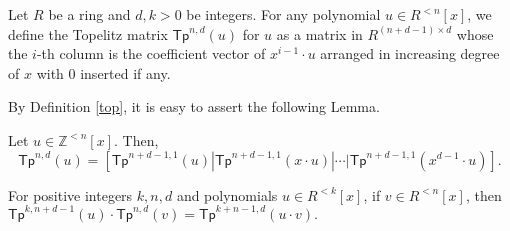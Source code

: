 \documentclass[runningheads]{llncs}
\begin{document}
\begin{definition} \label{top}
	Let $R$ be a ring and $d,k >0$ be integers.
	For any polynomial $u\in R^{<n}[x]$, we define the Topelitz matrix $\mathsf{Tp}^{n,d}(u)$ for $u$ as a matrix in $R^{(n+d-1) \times d}$ whose the $i$-th column is the coefficient vector of $x^{i-1}\cdot u$ arranged in increasing degree of $x$ with $0$ inserted if any. %
	
\end{definition}


By Definition \ref{top}, it is easy to assert the following Lemma.

\begin{lemma}\label{lem2} Let $u \in \mathbb{Z}^{<n}[x]$. Then,
	$$\mathsf{Tp}^{n,d}(u)=[\mathsf{Tp}^{n+d-1,1}(u)|\mathsf{Tp}^{n+d-1,1}(x\cdot u)|\cdots |\mathsf{Tp}^{n+d-1,1}(x^{d-1}\cdot u)].$$
	
\end{lemma}

\begin{lemma} \label{lem1}
	For positive integers $k, n, d$ and polynomials $u\in R^{<k}[x]$, 
	if $v\in R^{<n}[x]$, then
	$\mathsf{Tp}^{k,n+d-1}(u)\cdot \mathsf{Tp}^{n,d}(v)= \mathsf{Tp}^{k+n-1,d}(u\cdot v).$
\end{lemma} 
\end{document}
